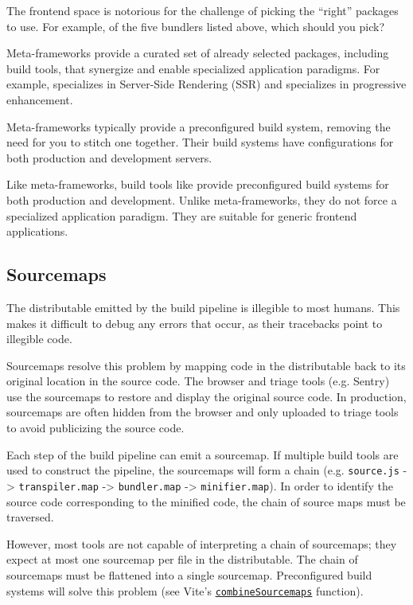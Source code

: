 \documentclass{article}
\begin{document}
The frontend space is notorious for the challenge of picking the ``right'' packages to use. For
example, of the five bundlers listed above, which should you pick?

Meta-frameworks provide a curated set of already selected packages, including build tools, that
synergize and enable specialized application paradigms. For example,
\href{https://nextjs.org}{} specializes in Server-Side Rendering (SSR) and
\href{https://remix.run}{} specializes in progressive enhancement.

Meta-frameworks typically provide a preconfigured build system, removing the need for you to stitch
one together. Their build systems have configurations for both production and development servers.

Like meta-frameworks, build tools like \href{https://vitejs.dev/}{} provide preconfigured
build systems for both production and development. Unlike meta-frameworks, they do not force a
specialized application paradigm. They are suitable for generic frontend applications.

\subsection{Sourcemaps}

The distributable emitted by the build pipeline is illegible to most humans. This makes it difficult
to debug any errors that occur, as their tracebacks point to illegible code.

Sourcemaps resolve this problem by mapping code in the distributable back to its original location
in the source code. The browser and triage tools (e.g. Sentry) use the sourcemaps to restore and
display the original source code. In production, sourcemaps are often hidden from the browser and
only uploaded to triage tools to avoid publicizing the source code.

Each step of the build pipeline can emit a sourcemap. If multiple build tools are used to construct
the pipeline, the sourcemaps will form a chain (e.g. \texttt{source.js} -> \texttt{transpiler.map}
-> \texttt{bundler.map} -> \texttt{minifier.map}). In order to identify the source code
corresponding to the minified code, the chain of source maps must be traversed.

However, most tools are not capable of interpreting a chain of sourcemaps; they expect at most one
sourcemap per file in the distributable. The chain of sourcemaps must be flattened into a single
sourcemap. Preconfigured build systems will solve this problem (see Vite's
\href{https://github.com/vitejs/vite/blob/feae09fdfab505e58950c915fe5d8dd103d5ffb9/packages/vite/src/node/utils.ts\#L831}{\texttt{combineSourcemaps}}
function).
\end{document}
